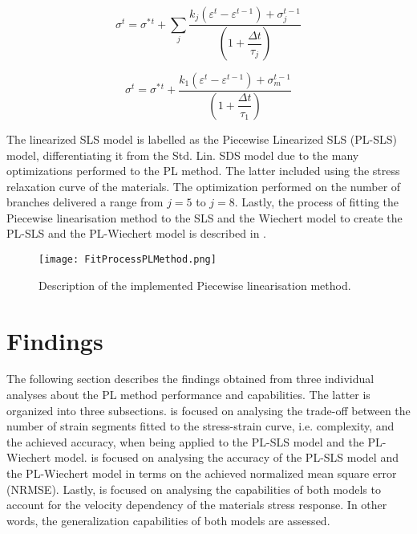 \begin{equation}
\label{eq6}
\sigma^t = \sigma^*{^t} + \sum_j \frac{k_j (\varepsilon^t-\varepsilon^{t-1}) + \sigma_j^{t-1}}{\left( 1 + \dfrac{\Delta t}{\tau_j}\right) }
\end{equation}

\begin{equation}
\label{eq7}
\sigma^t = \sigma^*{^t} + \frac{k_1(\varepsilon^t - \varepsilon^{t-1}) + \sigma_m^{t-1}}{ \left( 1+\dfrac{\Delta t}{\tau_1} \right) }
\end{equation}

The linearized SLS model  is labelled as the Piecewise Linearized SLS (PL-SLS) model, differentiating it from the Std. Lin. SDS model due to the many optimizations performed to the PL method. The latter included using the stress relaxation curve of the materials. The optimization performed on the number of branches delivered a range from $j=5$ to $j=8$. Lastly, the process of fitting the Piecewise linearisation method to the SLS and the Wiechert model to create the PL-SLS and the PL-Wiechert model is described in .

\begin{figure}[htb!]
	\centering
	\texttt{[image: FitProcessPLMethod.png]}
	\caption{ Description of the implemented Piecewise linearisation method.}
	\label{fig:FCFittingProcess}
\end{figure}

\section{Findings}

The following section describes the findings obtained from three individual analyses about the PL method performance and capabilities. The latter is organized into three subsections.  is focused on analysing the trade-off between the number of strain segments fitted to the stress-strain curve, i.e. complexity, and the achieved accuracy, when being applied to the PL-SLS model and the PL-Wiechert model.  is focused on analysing the accuracy of the PL-SLS model and the PL-Wiechert model in terms on the achieved normalized mean square error (NRMSE). Lastly,  is focused on analysing the capabilities of both models to account for the velocity dependency of the materials stress response. In other words, the generalization capabilities of both models are assessed.


